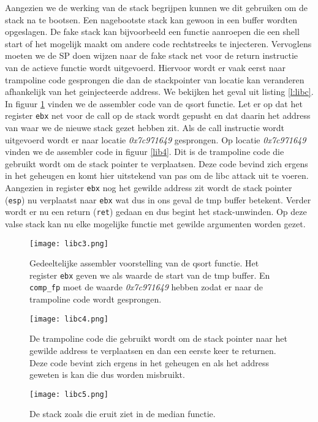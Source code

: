 \documentclass[../main.tex]{subfiles}
\begin{document}
Aangezien we de werking van de stack begrijpen kunnen we dit gebruiken om de stack na te bootsen.
Een nagebootste stack kan gewoon in een buffer wordten opgeslagen.
De fake stack kan bijvoorbeeld een functie aanroepen die een shell start of het mogelijk maakt om andere code rechtstreeks te injecteren.
Vervoglens moeten we de SP doen wijzen naar de fake stack net voor de return instructie van de actieve functie wordt uitgevoerd.
Hiervoor wordt er vaak eerst naar trampoline code gesprongen die dan de stackpointer van locatie kan veranderen afhankelijk van het geinjecteerde address.
We bekijken het geval uit listing \ref{l:libc}.
In figuur \ref{f:libc3} vinden we de assembler code van de qsort functie.
Let er op dat het register \texttt{ebx} net voor de call op de stack wordt gepusht en dat daarin het address van waar we de nieuwe stack gezet hebben zit.
Als de call instructie wordt uitgevoerd wordt er naar locatie \textit{0x7c971649} gesprongen.
Op locatie \textit{0x7c971649} vinden we de assembler code in figuur \ref{lib4}.
Dit is de trampoline code die gebruikt wordt om de stack pointer te verplaatsen.
Deze code bevind zich ergens in het geheugen en komt hier uitstekend van pas om de libc attack uit te voeren.
Aangezien in register \texttt{ebx} nog het gewilde address zit wordt de stack pointer (\texttt{esp}) nu verplaatst naar \texttt{ebx} wat dus in ons geval de tmp buffer betekent.
Verder wordt er nu een return (\texttt{ret}) gedaan en dus begint het stack-unwinden.
Op deze valse stack kan nu elke mogelijke functie met gewilde argumenten worden gezet.
\begin{figure}
\centering
\texttt{[image: libc3.png]}
\caption{Gedeeltelijke assembler voorstelling van de qsort functie. Het register \texttt{ebx} geven we als waarde de start van de tmp buffer. En \texttt{comp\_fp} moet de waarde \textit{0x7c971649} hebben zodat er naar de trampoline code wordt gesprongen.}
\label{f:libc3}
\end{figure}

\begin{figure}
\centering
\texttt{[image: libc4.png]}
\caption{De trampoline code die gebruikt wordt om de stack pointer naar het gewilde address te verplaatsen en dan een eerste keer te returnen. Deze code bevint zich ergens in het geheugen en als het address geweten is kan die dus worden misbruikt.}
\label{f:libc4}
\end{figure}

\begin{figure}
\centering
\texttt{[image: libc5.png]}
\caption{De stack zoals die eruit ziet in de median functie.}
\label{f:libc5}
\end{figure}
\end{document}
